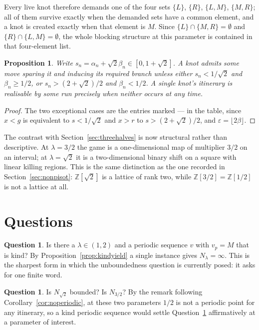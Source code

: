 \documentclass[11pt,reqno]{amsart}
\theoremstyle{plain}
\newtheorem{proposition}[theorem]{Proposition}
\theoremstyle{definition}
\newtheorem{question}[theorem]{Question}
\theoremstyle{remark}
\newcommand{\Z}{\mathbb{Z}}
\begin{document}
Every live knot therefore demands one of the four sets $\{L\}$, $\{R\}$,
$\{L,M\}$, $\{M,R\}$; all of them survive exactly when the demanded sets have a
common element, and a knot is created exactly when that element is $M$. Since
$\{L\}\cap\{M,R\}=\emptyset$ and $\{R\}\cap\{L,M\}=\emptyset$, the whole
blocking structure at this parameter is contained in that four-element list.

\begin{proposition}\label{prop:squaresurv}
Write $s_n=\alpha_n+\sqrt2\beta_n\in[0,1+\sqrt2]$. A knot admits some move
sparing it and inducing its required branch unless either $s_n<1/\sqrt2$ and
$\beta_n\geq1/2$, or $s_n>(2+\sqrt2)/2$ and $\beta_n<1/2$. A single knot's
itinerary is realisable by some run precisely when neither occurs at any time.
\end{proposition}

\begin{proof}
The two exceptional cases are the entries marked --- in the table, since
$x<g$ is equivalent to $s<1/\sqrt2$ and $x>r$ to $s>(2+\sqrt2)/2$, and
$\varepsilon=\lfloor2\beta\rfloor$.
\end{proof}

The contrast with Section~\ref{sec:threehalves} is now structural rather than
descriptive. At $\lambda=3/2$ the game is a one-dimensional map of multiplier
$3/2$ on an interval; at $\lambda=\sqrt2$ it is a two-dimensional binary shift
on a square with linear killing regions. This is the same distinction as the one
recorded in Section~\ref{sec:nonpisot}: $\Z[\sqrt2]$ is a lattice of rank two,
while $\Z[3/2]=\Z[1/2]$ is not a lattice at all.

\section{Questions}\label{sec:questions}

\begin{question}\label{q:kind}
Is there a $\lambda\in(1,2)$ and a periodic sequence $v$ with $v_p=M$ that is
kind? By Proposition~\ref{prop:kindyield} a single instance gives
$N_\lambda=\infty$. This is the sharpest form in which the unboundedness
question is currently posed: it asks for one finite word.
\end{question}

\begin{question}
Is $N_{\sqrt2}$ bounded? Is $N_{3/2}$? By the remark following
Corollary~\ref{cor:noperiodic}, at these two parameters $1/2$ is not a periodic
point for any itinerary, so a kind periodic sequence would settle
Question~\ref{q:kind} affirmatively at a parameter of interest.
\end{question}
\end{document}
